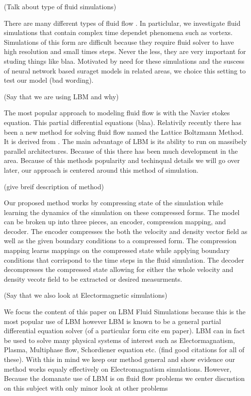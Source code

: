 \documentclass{article}
\begin{document}
(Talk about type of fluid simulations)

There are many different types of fluid flow . In particlular, we investigate fluid simulations that contain complex time dependet phenomena such as vortexs. Simulations of this form are difficult because they require fluid solver to have high resolution and small times steps. Never the less, they are very important for studing things like blaa. Motivated by need for these simulations and the suscess of neural network based suraget models in related areas, we choice this setting to test our model (bad wording).

(Say that we are using LBM and why)

The most popular approach to modeling fluid flow is with the Navier stokes equation. This partial differential equations (blaa). Relativily recently there has been a new method for solving fluid flow named the Lattice Boltzmann Method. It is derived from . The main advantage of LBM is its ability to run on massibely parallel architectures. Because of this there has been much development in the area. Because of this methods popularity and techinqual details we will go over later, our approach is centered around this method of simulation.

(give breif description of method)

Our proposed method works by compressing state of the simulation while learning the dynamics of the simulation on these compressed forms. The model can be broken up into three pieces, an encoder, compression mapping, and decoder. The encoder compresses the both the velocity and density vector field as well as the given boundary conditions to a compressed form. The compression mapping learns mappings on the compressed state while applying boundary conditions that corrispond to the time steps in the fluid simulation. The decoder decompresses the compressed state allowing for either the whole velocity and density vecotr field to be extracted or desired measurments.

(Say that we also look at Electormagnetic simulations)

We focus the content of this paper on LBM Fluid Simulations because this is the most popular use of LBM however LBM is known to be a general partial differential equation solver (of a particular form cite em paper). LBM can in fact be used to solve many physical systems of interest such as Electormagnatism, Plasma, Multiphase flow, Schordiener equation etc. (find good citations for all of these). With this in mind we keep our method general and show evidence our method works equaly effectively on Electromagnatism simulations. However, Because the domanate use of LBM is on fluid flow problems we center discustion on this subject with only minor look at other problems
\end{document}

